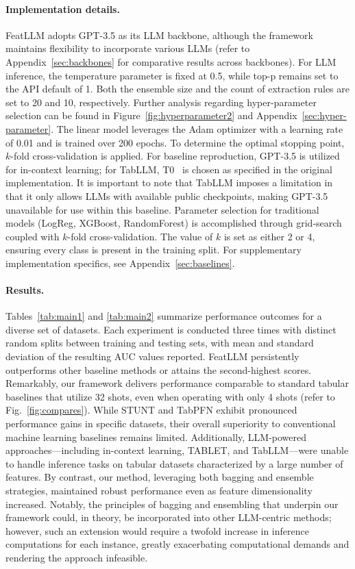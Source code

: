 \paragraph{Implementation details.}
\textsf{FeatLLM} adopts GPT-3.5 as its LLM backbone, although the framework maintains flexibility to incorporate various LLMs (refer to Appendix~\ref{sec:backbones} for comparative results across backbones). For LLM inference, the temperature parameter is fixed at 0.5, while top-p remains set to the API default of 1. Both the ensemble size and the count of extraction rules are set to 20 and 10, respectively. Further analysis regarding hyper-parameter selection can be found in Figure~\ref{fig:hyperparameter2} and Appendix~\ref{sec:hyper-parameter}. 
The linear model leverages the Adam optimizer with a learning rate of 0.01 and is trained over 200 epochs. To determine the optimal stopping point, $k$-fold cross-validation is applied. For baseline reproduction, GPT-3.5 is utilized for in-context learning; for TabLLM, T0~\cite{sanh2022multitask} is chosen as specified in the original implementation. It is important to note that TabLLM imposes a limitation in that it only allows LLMs with available public checkpoints, making GPT-3.5 unavailable for use within this baseline. Parameter selection for traditional models (LogReg, XGBoost, RandomForest) is accomplished through grid-search coupled with $k$-fold cross-validation. The value of $k$ is set as either 2 or 4, ensuring every class is present in the training split. For supplementary implementation specifics, see Appendix~\ref{sec:baselines}.

\vspace*{-0.12in}
\paragraph{Results.}
Tables~\ref{tab:main1} and \ref{tab:main2} summarize performance outcomes for a diverse set of datasets. Each experiment is conducted three times with distinct random splits between training and testing sets, with mean and standard deviation of the resulting AUC values reported. \textsf{FeatLLM} persistently outperforms other baseline methods or attains the second-highest scores. Remarkably, our framework delivers performance comparable to standard tabular baselines that utilize 32 shots, even when operating with only 4 shots (refer to Fig.~\ref{fig:compares}). While STUNT and TabPFN exhibit pronounced performance gains in specific datasets, their overall superiority to conventional machine learning baselines remains limited. Additionally, LLM-powered approaches—including in-context learning, TABLET, and TabLLM—were unable to handle inference tasks on tabular datasets characterized by a large number of features. By contrast, our method, leveraging both bagging and ensemble strategies, maintained robust performance even as feature dimensionality increased. Notably, the principles of bagging and ensembling that underpin our framework could, in theory, be incorporated into other LLM-centric methods; however, such an extension would require a twofold increase in inference computations for each instance, greatly exacerbating computational demands and rendering the approach infeasible.

